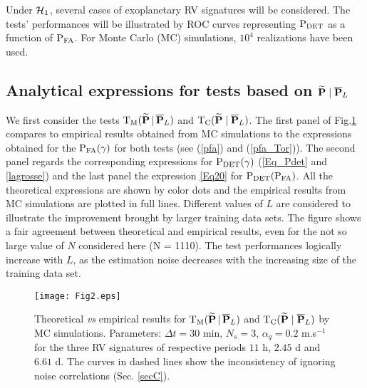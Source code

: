 \documentclass[journal]{IEEEtran}
\begin{document}
{  Under ${\cal{H}}_1$, several cases of exoplanetary RV signatures will be considered.
}
The tests' performances will be illustrated by ROC curves representing  $\rm P_{DET}$ as a function of $\rm P_{FA}$.
{   For { Monte Carlo (MC)} simulations,  $10^4$  realizations have been used. }
  \subsection{Analytical expressions for tests based on ${\bf \widetilde{\bf P}}\;|\;\overline{\bf P}_L$ }
  \label{SecB}
We first consider the tests ${\rm T_M}( {\bf \widetilde{\bf P}}\,|\,\overline{\bf P}_L)$ and ${\rm T_{C}}( {\bf \widetilde{\bf P}}\;|\;\overline{\bf P}_L)$.  
{ The first panel of Fig.\ref{Fig2} compares to empirical results obtained from MC simulations to the expressions obtained for the  $\rm P_{FA}(\gamma)$ for both tests (see (\ref{pfa}) and (\ref{pfa_Tor})). The second panel regards the corresponding expressions for $\rm P_{DET}(\gamma)$    (\eqref{Eq_Pdet} and  \eqref{lagrosse}) and the last panel the  expression   \eqref{Eq20} for $\rm P_{DET}(P_{FA})$. All the theoretical expressions are shown by color dots and the empirical results from MC simulations are plotted in full lines. }
Different values of $L$ are considered to illustrate the improvement brought by larger training data sets.
The figure shows a fair agreement between theoretical and empirical results, even for the { not} so large value of $N$ considered here { (N = 1110)}. The test performances logically increase with $L$, as the estimation noise decreases with the increasing size of the training data set. 
\begin{figure}[htb!]   
\centerline{\texttt{[image: Fig2.eps]}	}
	\caption{ Theoretical \textit{vs} empirical results for ${\rm T_M}( {\bf \widetilde{\bf P}}\,|\,\overline{\bf P}_L)$ and ${\rm T_C}( {\bf \widetilde{\bf P}}\;|\;\overline{\bf P}_L)$ by MC simulations. { Parameters: $\Delta t = 30$ min, $N_s =  3$, $\alpha_q = 0.2$ m.s$^{-1}$ for the three RV signatures of respective periods $11$ h, $2.45$ d and $6.61$ d. The curves in dashed lines show the inconsistency of ignoring noise correlations (Sec. \ref{secC}). }}
		\vspace{-0.4cm}
	\label{Fig2}
\end{figure}
\end{document}
